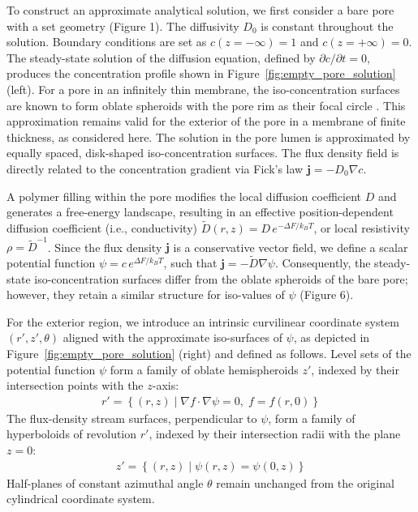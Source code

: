\documentclass[10pt, a4paper, twocolumn]{article}
\begin{document}
To construct an approximate analytical solution, we first consider a bare pore with a set geometry (Figure 1).
The diffusivity $D_0$ is constant throughout the solution.
Boundary conditions are set as $c(z=-\infty) = 1$ and $c(z=+\infty) = 0$.
The steady-state solution of the diffusion equation, defined by $\partial c/\partial t = 0$, produces the concentration profile shown in Figure~\ref{fig:empty_pore_solution} (left).
For a pore in an infinitely thin membrane, the iso-concentration surfaces are known to form oblate spheroids with the pore rim as their focal circle \cite{Cooke1966}.
This approximation remains valid for the exterior of the pore in a membrane of finite thickness, as considered here.
The solution in the pore lumen is approximated by equally spaced, disk-shaped iso-concentration surfaces. 
The flux density field is directly related to the concentration gradient via Fick's law \mbox{$\bm{j} = -D_0 \nabla c$}.

A polymer filling within the pore modifies the local diffusion coefficient $D$ and generates a free-energy landscape, resulting in an effective position-dependent diffusion coefficient (i.e., conductivity) $\tilde{D}(r,z) = D\,e^{-\Delta F/k_B T}$, or local resistivity $\rho = \tilde{D}^{-1}$.
Since the flux density $\bm{j}$ is a conservative vector field, we define a scalar potential function $\psi = c\,e^{\Delta F/k_B T}$, such that $\bm{j} = -\tilde{D}\nabla\psi$.
Consequently, the steady-state iso-concentration surfaces differ from the oblate spheroids of the bare pore; however, they retain a similar structure for iso-values of $\psi$ (Figure 6).

For the exterior region, we introduce an intrinsic curvilinear coordinate system $(r', z', \theta)$ aligned with the approximate iso-surfaces of $\psi$, as depicted in Figure~\ref{fig:empty_pore_solution} (right) and defined as follows.
Level sets of the potential function $\psi$ form a family of oblate hemispheroids $z'$, indexed by their intersection points with the $z$-axis:
\begin{gather}
    r' = \left\{(r,z) \mid \nabla f \cdot \nabla \psi = 0,\; f=f(r,0)\right\}
\end{gather}
The flux-density stream surfaces, perpendicular to $\psi$, form a family of hyperboloids of revolution $r'$, indexed by their intersection radii with the plane $z=0$:
\begin{gather}
    z' = \left\{(r,z) \mid \psi(r,z)=\psi(0,z)\right\}
\end{gather}
Half-planes of constant azimuthal angle $\theta$ remain unchanged from the original cylindrical coordinate system.
\end{document}

